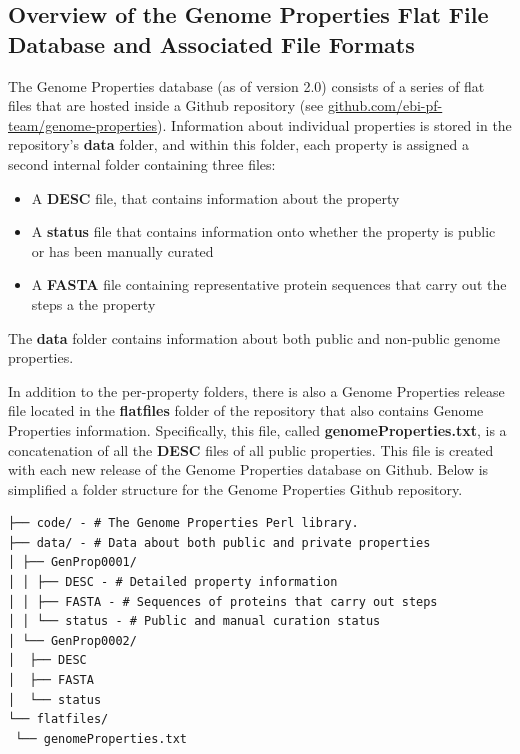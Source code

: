 \subsection{Overview of the Genome Properties Flat File Database and Associated File Formats} \label{Genome-Properties-Files} 

The Genome Properties database (as of version 2.0) consists of a series of flat files that are hosted inside a Github repository (see \href{github.com/ebi-pf-team/genome-properties}{github.com/ebi-pf-team/genome-properties}). Information about individual properties is stored in the repository's \textbf{data} folder, and within this folder, each property is assigned a second internal folder containing three files: 

\begin{itemize}
\item A \textbf{DESC} file, that contains information about the property
\item A \textbf{status} file that contains information onto whether the property is public or has been manually curated
\item A \textbf{FASTA} \cite{pearson19905} file containing representative protein sequences that carry out the steps a the property
\end{itemize}

The \textbf{data} folder contains information about both public and non-public genome properties. 

In addition to the per-property folders, there is also a Genome Properties release file located in the \textbf{flatfiles} folder of the repository that also contains Genome Properties information. Specifically, this file, called \textbf{genomeProperties.txt}, is a concatenation of all the \textbf{DESC} files of all public properties. This file is created with each new release of the Genome Properties database on Github. Below is simplified a folder structure for the Genome Properties Github repository.

\begin{verbatim}
├── code/ - # The Genome Properties Perl library.
├── data/ - # Data about both public and private properties
│ ├── GenProp0001/
│ │ ├── DESC - # Detailed property information
│ │ ├── FASTA - # Sequences of proteins that carry out steps
│ │ └── status - # Public and manual curation status
│ └── GenProp0002/
│  ├── DESC
│  ├── FASTA
│  └── status
└── flatfiles/
 └── genomeProperties.txt
\end{verbatim}

